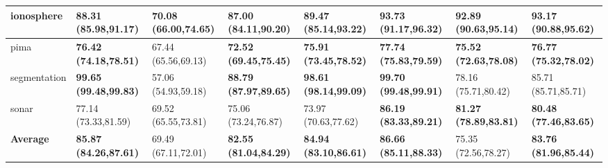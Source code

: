 \documentclass[conference]{IEEEtran}
\begin{document}
\begin{table*}[thpbh]
\begin{adjustbox}{width=1\textwidth}
\begin{tabular}{@{}cccccccc@{}}
			\multicolumn{1}{|l|}{ionosphere}   & \multicolumn{1}{l|}{\textbf{88.31 (85.98,91.17)}} & \multicolumn{1}{l|}{70.08 (66.00,74.65)} & \multicolumn{1}{l|}{\textbf{87.00 (84.11,90.20)}} & \multicolumn{1}{l|}{\textbf{89.47 (85.14,93.22)}}  & \multicolumn{1}{l|}{\textbf{93.73 (91.17,96.32)}}    & \multicolumn{1}{l|}{\textbf{92.89 (90.63,95.14)}}    & \multicolumn{1}{l|}{93.17 (90.88,95.62)}    \\ \midrule
			\multicolumn{1}{|l|}{pima}         & \multicolumn{1}{l|}{\textbf{76.42 (74.18,78.51)}} & \multicolumn{1}{l|}{67.44 (65.56,69.13)} & \multicolumn{1}{l|}{\textbf{72.52 (69.45,75.45)}} & \multicolumn{1}{l|}{\textbf{75.91 (73.45,78.52)}}  & \multicolumn{1}{l|}{\textbf{77.74 (75.83,79.59)}}    & \multicolumn{1}{l|}{\textbf{75.52 (72.63,78.08)}}    & \multicolumn{1}{l|}{\textbf{76.77 (75.32,78.02)}}    \\ \midrule
			\multicolumn{1}{|l|}{segmentation} & \multicolumn{1}{l|}{\textbf{99.65 (99.48,99.83)}} & \multicolumn{1}{l|}{57.06 (54.93,59.18)} & \multicolumn{1}{l|}{\textbf{88.79 (87.97,89.65)}} & \multicolumn{1}{l|}{\textbf{98.61 (98.14,99.09)}}  & \multicolumn{1}{l|}{\textbf{99.70 (99.48,99.91)}}    & \multicolumn{1}{l|}{78.16 (75.71,80.42)}    & \multicolumn{1}{l|}{85.71 (85.71,85.71)}    \\ \midrule
			\multicolumn{1}{|l|}{sonar}        & \multicolumn{1}{l|}{77.14 (73.33,81.59)} & \multicolumn{1}{l|}{69.52 (65.55,73.81)} & \multicolumn{1}{l|}{75.06 (73.24,76.87)} & \multicolumn{1}{l|}{73.97 (70.63,77.62)}  & \multicolumn{1}{l|}{\textbf{86.19 (83.33,89.21)}}    & \multicolumn{1}{l|}{\textbf{81.27 (78.89,83.81)}}    & \multicolumn{1}{l|}{\textbf{80.48 (77.46,83.65)}}    \\
			\midrule
			\multicolumn{1}{|l|}{\textbf{Average}}        & \multicolumn{1}{l|}{\textbf{85.87 (84.26,87.61)}} & \multicolumn{1}{l|}{69.49 (67.11,72.01)} & \multicolumn{1}{l|}{\textbf{82.55 (81.04,84.29)}} & \multicolumn{1}{l|}{\textbf{84.94 (83.10,86.61)}}  & \multicolumn{1}{l|}{\textbf{86.66 (85.11,88.33)}}    & \multicolumn{1}{l|}{75.35 (72.56,78.27)}    & \multicolumn{1}{l|}{\textbf{83.76 (81.96,85.44)}} \\ \bottomrule
		\end{tabular}
		\end{adjustbox}
	\end{table*}
\end{document}
